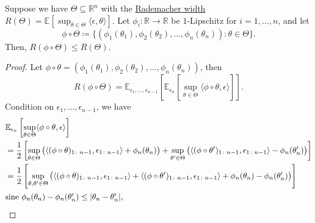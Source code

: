 \begin{theorem}\label{thm:contraction-principle}
	Suppose we have \(\Theta \subseteq \mathbb{R} ^n\) with the \hyperref[def:Rademacher-width]{Rademacher width} \(R(\Theta ) = \mathbb{E}_{}\left[\sup _{\theta \in \Theta } \langle \epsilon , \theta  \rangle \right] \). Let \(\phi _i \colon \mathbb{R} \to \mathbb{R} \) be \(1\)-Lipschitz for \(i=1, \dots , n\), and let
	\[
		\phi \circ \Theta \coloneqq \{ \left(\phi _1(\theta _1), \phi _2(\theta _2), \dots , \phi _n(\theta _n) \right) \colon \theta \in \Theta \}.
	\]
	Then, \(R(\phi \circ \Theta ) \leq R(\Theta )\).
\end{theorem}
\begin{proof}
	Let \(\phi \circ \theta = (\phi _1(\theta _1), \phi _2(\theta _2), \dots , \phi _n(\theta _n))\), then
	\[
		R(\phi \circ \Theta )
		= \mathbb{E}_{\epsilon _1, \dots , \epsilon _{n-1}}\left[ \mathbb{E}_{\epsilon _n}\left[ \sup _{\theta \in \Theta } \langle \phi \circ \theta , \epsilon  \rangle  \right] \right] .
	\]
	Condition on \(\epsilon _1, \dots , \epsilon _{n-1}\), we have
	\begin{align*}
		 & \mathbb{E}_{\epsilon _n}\left[ \sup _{\theta \in \Theta } \langle \phi \circ \theta , \epsilon  \rangle  \right]                                                            \\
		 & = \frac{1}{2} \left[
			\sup _{\theta \in \Theta } \big( \langle (\phi \circ \theta) _{1 \colon n-1}, \epsilon _{1 \colon n-1} \rangle + \phi _n(\theta _n) \big)
			+ \sup _{\theta ^{\prime} \in \Theta } \big( \langle (\phi \circ \theta ^{\prime}) _{1\colon n-1} , \epsilon _{1\colon n-1} \rangle - \phi _n (\theta ^{\prime} _n) \big)
		\right]                                                                                                                                                                        \\
		 & = \frac{1}{2} \left[
			\sup _{\theta , \theta ^{\prime} \in \Theta } \big( \langle (\phi \circ \theta )_{1 \colon n-1}, \epsilon _{1 \colon n-1} \rangle
			+ \langle (\phi \circ \theta ^{\prime} )_{1\colon n-1} , \epsilon _{1 \colon n-1}\rangle + \phi _n(\theta _n) - \phi _n(\theta ^{\prime} _n) \big)
		\right]                                                                                                                                                                        \\
		\shortintertext{sine \(\phi _n(\theta _n) - \phi _n(\theta _n^{\prime} ) \leq \vert \theta _n - \theta _n^{\prime} \vert \),}

\end{align*}
\end{proof}
